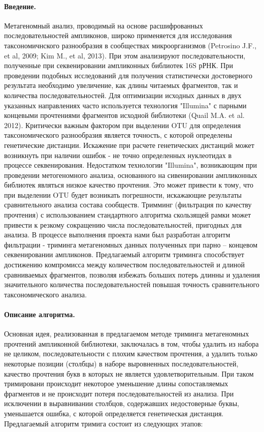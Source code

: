 \documentclass[a4paper,12pt,openany,final]{extreport}
\begin{document}
\paragraph{Введение.} Метагеномный анализ, проводимый на основе
расшифрованных последовательностей ампликонов, широко применяется для
исследования таксономичнского разнообразия в сообществах микроорганизмов
(Petrosino J.F., et al, 2009; Kim M., et al, 2013). При этом анализируют
последовательности, полученные при секвенировании ампликонных библиотек
16S рРНК. При проведении подобных исследований для получения
статистически достоверного результата необходимо увеличение, как длины
читаемых фрагментов, так и количества последовательностей. Для
оптимизации исходных данных в двух указанных направлениях часто
используется технология "Illumina" с парными концевыми прочтениями
фрагментов исходной библиотеки (Quail M.A. et al. 2012). Критически
важным фактором при выделении OTU для определения таксономического
разнообразия является точность, с которой определены генетические
дистанции. Искажение при расчете генетических дистанций может возникнуть
при наличии ошибок - не точно определенных нуклеотидах в процессе
секвенирования. Недостатком технологии "Illumina", возникающим при
проведении метогеномного анализа, основанного на сивенировании
ампликонных библиотек являться низкое качество прочтения. Это может
привести к тому, что при выделении OTU будет возникать погрешности,
искажающие результаты сравнительного анализа состава сообществ. Тримминг
(фильтрация по качеству прочтения) с использованием стандартного
алгоритма скользящей рамки может привести к резкому сокращению числа
последовательностей, пригодных для анализа. В процессе выполнения
проекта нами был разработан алгоритм фильтрации - триминга метагеномных
данных полученных при парно -- концевом секвенировании ампликонов.
Предлагаемый алгоритм триминга способствует достижению компромисса между
количеством последовательностей и длиной сравниваемых фрагментов,
позволяя избежать больших потерь длинны и удаления значительного
количества последовательностей повышая точность сравнительного
таксономического анализа.

\paragraph{Описание алгоритма.} Основная идея, реализованная в
предлагаемом методе триминга метагеномных прочтений ампликонной
библиотеки, заключалась в том, чтобы удалить из набора не целиком,
последовательности с плохим качеством прочтения, а удалить только
некоторые позиции (столбцы) в наборе выровненных последовательностей,
качество прочтения букв в которых не является удовлетворительным. При
таком тримировани происходит некоторое уменьшение длины сопоставляемых
фрагментов и не происходит потеря последовательностей из анализа. При
исключении в выравнивании столбцов, содержавших недостоверные буквы,
уменьшается ошибка, с которой определяется генетическая дистанция.
Предлагаемый алгоритм тримига состоит из следующих этапов:
\end{document}

